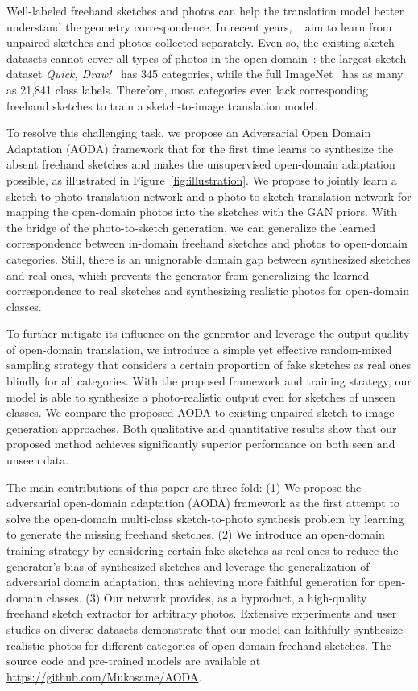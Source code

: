 \documentclass[10pt,twocolumn,letterpaper]{article}
\begin{document}
Well-labeled freehand sketches and photos can help the translation model better understand the geometry correspondence. In recent years, ~\cite{zhu2017unpaired,liu2017unsupervised,huang2018multimodal,lee2018diverse,kim2019u,liu2019unpaired} aim to learn from unpaired sketches and photos collected separately. Even so, the existing sketch datasets cannot cover all types of photos in the open domain~\cite{panareda2017open}: the largest sketch dataset \textit{Quick, Draw!}~\cite{ha2017neural} has 345 categories, while the full ImageNet~\cite{imagenet_cvpr09} has as many as 21,841 class labels. Therefore, most categories even lack corresponding freehand sketches to train a sketch-to-image translation model.

To resolve this challenging task, we propose an Adversarial Open Domain Adaptation (AODA) framework that for the first time learns to synthesize the absent freehand sketches and makes the unsupervised open-domain adaptation possible, as illustrated in Figure~\ref{fig:illustration}. We propose to jointly learn a sketch-to-photo translation network and a photo-to-sketch translation network for mapping the open-domain photos into the sketches with the GAN priors. With the bridge of the photo-to-sketch generation, we can generalize the learned correspondence between in-domain freehand sketches and photos to open-domain categories. Still, there is an unignorable domain gap between synthesized sketches and real ones, which prevents the generator from generalizing the learned correspondence to real sketches and synthesizing realistic photos for open-domain classes. 

To further mitigate its influence on the generator and leverage the output quality of open-domain translation, we introduce a simple yet effective random-mixed sampling strategy that considers a certain proportion of fake sketches as real ones blindly for all categories. With the proposed framework and training strategy, our model is able to synthesize a photo-realistic output even for sketches of unseen classes.
We compare the proposed AODA to existing unpaired sketch-to-image generation approaches. Both qualitative and quantitative results show that our proposed method achieves significantly superior performance on both seen and unseen data.


The main contributions of this paper are three-fold: (1) We propose the adversarial open-domain adaptation (AODA) framework as the first attempt to solve the open-domain multi-class sketch-to-photo synthesis problem by learning to generate the missing freehand sketches. (2) We introduce an open-domain training strategy by considering certain fake sketches as real ones to reduce the generator's bias of synthesized sketches and leverage the generalization of adversarial domain adaptation, thus achieving more faithful generation for open-domain classes. (3) Our network provides, as a byproduct, a high-quality freehand sketch extractor for arbitrary photos. Extensive experiments and user studies on diverse datasets demonstrate that our model can faithfully synthesize realistic photos for different categories of open-domain freehand sketches. The source code and pre-trained models are available at \href{https://github.com/Mukosame/AODA}{https://github.com/Mukosame/AODA}.
\end{document}
